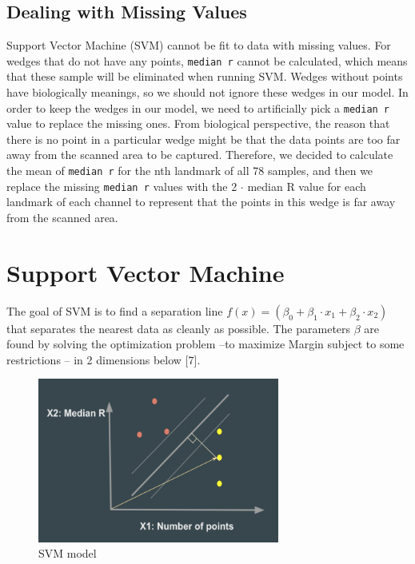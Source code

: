 \documentclass[10pt,letterpaper]{article}
\begin{document}
\subsection{Dealing with Missing
Values}\label{dealing-with-missing-values}

Support Vector Machine (SVM) cannot be fit to data with missing values.
For wedges that do not have any points, \texttt{median\ r} cannot be
calculated, which means that these sample will be eliminated when
running SVM. Wedges without points have biologically meanings, so we
should not ignore these wedges in our model. In order to keep the wedges
in our model, we need to artificially pick a \texttt{median\ r} value to
replace the missing ones. From biological perspective, the reason that
there is no point in a particular wedge might be that the data points
are too far away from the scanned area to be captured. Therefore, we
decided to calculate the mean of \texttt{median\ r} for the nth landmark
of all 78 samples, and then we replace the missing \texttt{median\ r}
values with the 2 \(\cdot\) median R value for each landmark of each
channel to represent that the points in this wedge is far away from the
scanned area.

\section{Support Vector Machine}\label{support-vector-machine-1}

The goal of SVM is to find a separation line
\(f(x) = (\beta_0 + \beta_1 \cdot x_1 + \beta_2 \cdot x_2)\) that
separates the nearest data as cleanly as possible. The parameters
\(\beta\) are found by solving the optimization problem --to maximize
Margin subject to some restrictions -- in 2 dimensions below {[}7{]}.

\begin{figure}[h]
\includegraphics[width=3.12in]{figures/svm_fig} \caption{SVM model}\label{fig:svmfig}
\end{figure}
\end{document}
